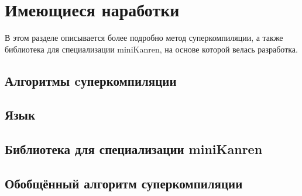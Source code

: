 \section{Имеющиеся наработки}

В этом разделе описывается более подробно метод суперкомпиляции,
а также библиотека для специализации miniKanren, на основе
которой велась разработка.

\subsection{Алгоритмы cуперкомпиляции}



\subsection{Язык \ukanren}



\subsection{Библиотека для специализации miniKanren}



\subsection{Обобщённый алгоритм суперкомпиляции}


